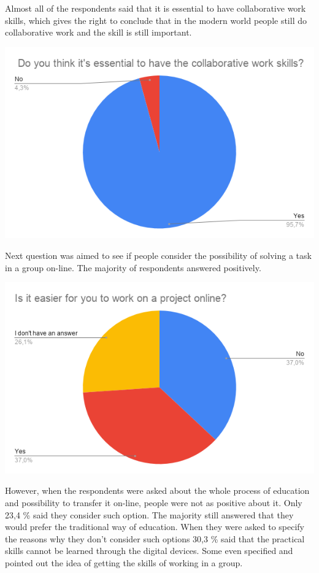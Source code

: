 \documentclass[10pt,twoside,English,a4paper]{article}
\begin{document}
Almost all of the respondents said that it is essential to have collaborative work skills, which gives the right to conclude that in the modern world people still do collaborative work and the skill is still important.

\includegraphics[width=\textwidth]{diagram2.png}

Next question was aimed to see if people consider the possibility of solving a task in a group on-line. The majority of respondents answered positively.  

\includegraphics[width=\textwidth]{diagram4.png}

However, when the respondents were asked about the whole process of education and possibility to transfer it on-line, people were not as positive about it. Only 23,4 \% said they consider such option. The majority still answered that they would prefer the traditional way of education. When they were asked to specify the reasons why they don't consider such options 30,3 \% said that the practical skills cannot be learned through the digital devices. Some even specified and pointed out the idea of getting the skills of working in a group.  
\end{document}
